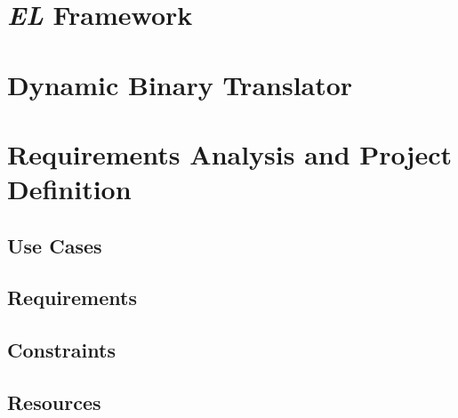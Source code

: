 \documentclass[12pt]{article}
\begin{document}
\newpage
\section{\textit{EL} Framework}

\newpage
\section{Dynamic Binary Translator}

\newpage
\section{Requirements Analysis and Project Definition}


\subsection{Use Cases}


\subsection{Requirements}


\subsection{Constraints}


\subsection{Resources}

%

\newpage
\end{document}

